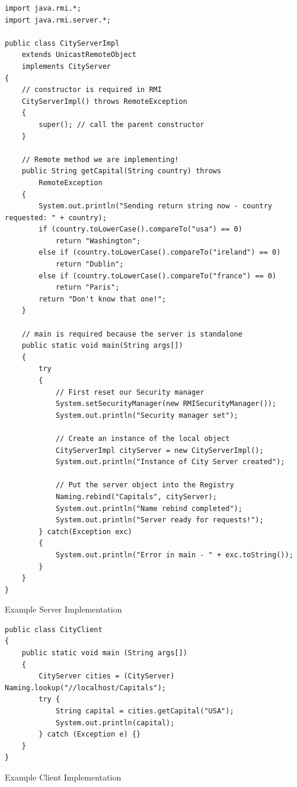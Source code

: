 \documentclass[a4paper,11pt]{article}
\newenvironment{code}{\captionsetup{type=listing}}{}
\begin{document}
\begin{code}
\begin{verbatim}
import java.rmi.*;
import java.rmi.server.*;

public class CityServerImpl
    extends UnicastRemoteObject
    implements CityServer
{
    // constructor is required in RMI
    CityServerImpl() throws RemoteException
    {
        super(); // call the parent constructor
    }

    // Remote method we are implementing!
    public String getCapital(String country) throws
        RemoteException
    {
        System.out.println("Sending return string now - country requested: " + country);
        if (country.toLowerCase().compareTo("usa") == 0)
            return "Washington";
        else if (country.toLowerCase().compareTo("ireland") == 0)
            return "Dublin";
        else if (country.toLowerCase().compareTo("france") == 0)
            return "Paris";
        return "Don't know that one!";
    }

    // main is required because the server is standalone
    public static void main(String args[])
    {
        try
        {
            // First reset our Security manager
            System.setSecurityManager(new RMISecurityManager());
            System.out.println("Security manager set");

            // Create an instance of the local object
            CityServerImpl cityServer = new CityServerImpl();
            System.out.println("Instance of City Server created");

            // Put the server object into the Registry
            Naming.rebind("Capitals", cityServer);
            System.out.println("Name rebind completed");
            System.out.println("Server ready for requests!");
        } catch(Exception exc)
        {
            System.out.println("Error in main - " + exc.toString());
        }
    }
}
\end{verbatim}
\caption{Example Server Implementation}
\end{code}

\begin{code}
\begin{verbatim}
public class CityClient
{
    public static void main (String args[])
    {
        CityServer cities = (CityServer) Naming.lookup("//localhost/Capitals");
        try {
            String capital = cities.getCapital("USA");
            System.out.println(capital);
        } catch (Exception e) {}
    }
}
\end{verbatim}
\caption{Example Client Implementation}
\end{code}
\end{document}
